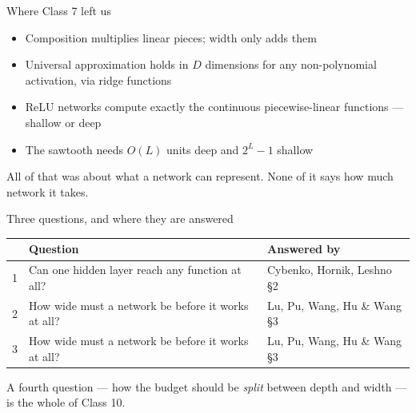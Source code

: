 \documentclass[aspectratio=169, 11pt]{beamer}
\begin{document}
\begin{frame}{Where Class 7 left us}
  \vspace{0.3em}
  \begin{itemize}\setlength{\itemsep}{4pt}
    \item Composition \alert{multiplies} linear pieces; width only
          \alert{adds} them
    \item Universal approximation holds in $D$ dimensions for any
          non-polynomial activation, via ridge functions
    \item ReLU networks compute \alert{exactly} the continuous
          piecewise-linear functions --- shallow or deep
    \item The sawtooth needs $O(L)$ units deep and $2^{L}-1$ shallow
  \end{itemize}
  \vspace{0.4em}
  \begin{redhighlight}
    All of that was about \alert{what} a network can represent. None of
    it says \alert{how much network} it takes.
  \end{redhighlight}
\end{frame}

\begin{frame}{Three questions, and where they are answered}
  \vspace{0.2em}
  \centering
  \renewcommand{\arraystretch}{1.35}
  {\small
  \begin{tabular}{p{} p{}
                  p{}}
    & \textbf{Question} & \textbf{Answered by}\\
    \hline
    1 & Can one hidden layer reach any function at all?
      & Cybenko, Hornik, Leshno \hfill{\scriptsize \S2}\\
    2 & How wide must a network be before it works at all?
      & Lu, Pu, Wang, Hu \& Wang \hfill{\scriptsize \S3}\\
    3 & How wide must a network be before it works at all?
      & Lu, Pu, Wang, Hu \& Wang \hfill{\scriptsize \S3}\\
    \hline
  \end{tabular}}
  \vspace{0.7em}

  {\small A fourth question --- how the budget should be \emph{split}
  between depth and width --- is the whole of \alert{Class 10}.}
\end{frame}
\end{document}

